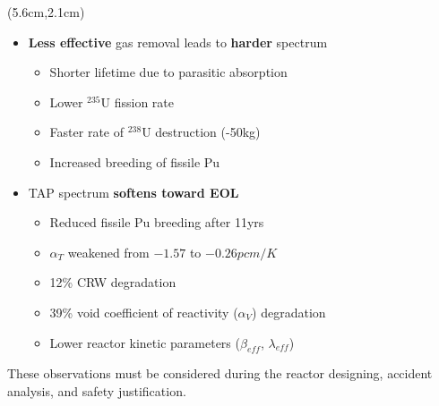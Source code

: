 \begin{frame}
\begin{textblock*}{12.4cm}
\begin{columns}
		\column[t]{6cm}
		\begin{textblock*}{7.3cm}(5.6cm,2.1cm) %
		\begin{itemize}
			\itemsep=0.3em
			\item \textbf{Less effective} gas removal leads to \textbf{harder} 
			spectrum
			\begin{itemize}
				\itemsep=0.5em
				\item Shorter lifetime due to parasitic absorption
				\item Lower $^{235}$U fission rate
				\item Faster rate of $^{238}$U destruction (-50kg)
				\item Increased breeding of fissile Pu
			\end{itemize}
			
			\item TAP spectrum \textbf{softens toward EOL}
			\begin{itemize}
				\itemsep=0.5em
				\item Reduced fissile Pu breeding after 11yrs
				\item $\alpha_T$ weakened 
				from $-1.57$ to $-0.26pcm/K$
				\item 12\% CRW degradation
				\item 39\% void coefficient of reactivity ($\alpha_V$) 
				degradation
				\item Lower reactor kinetic parameters ($\beta_{eff}$, 
				$\lambda_{eff}$)
			\end{itemize} 
		\end{itemize}
	
	{\par\small	These observations must be considered during the reactor 
	designing, accident analysis, and safety justification.}
		\end{textblock*}
	
	
	\end{columns}
\end{textblock*}
\end{frame}